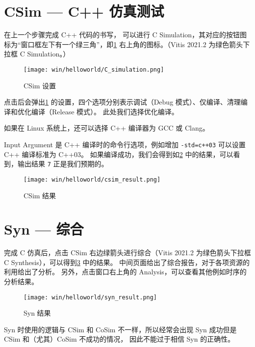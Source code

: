 \documentclass[Chinese,TC,use boldface,simple Names]{beaulivre}
\begin{document}
  \section{CSim --- C++ 仿真测试}

    在上一个步骤完成 C++ 代码的书写，
    可以进行 C Simulation，其对应的按钮图标为“窗口框左下有一个绿三角”，即\cref{fig:C_simulation} 右上角的图标。（Vitis 2021.2 为绿色箭头下拉框 C Simulation。）
    \begin{figure}[htbp]
      \centering
      \texttt{[image: win/helloworld/C\_simulation.png]}
      \caption{CSim 设置}
      \label{fig:C_simulation}
    \end{figure}

    点击后会弹出\cref{fig:C_simulation} 的设置，四个选项分别表示调试（Debug 模式）、仅编译、清理编译和优化编译（Release 模式）。
    此处我们选择优化编译。
    \begin{tip}
      如果在 Linux 系统上，还可以选择 C++ 编译器为 GCC 或 Clang。
    \end{tip}
    Input Argument 是 C++ 编译时的命令行选项，例如增加 \texttt{-std=c++03} 可以设置 C++ 编译标准为 C++03。
    如果编译成功，我们会得到如\cref{fig:csim_result} 中的结果，可以看到，输出结果 \texttt{7} 正是我们预期的。
    \begin{figure}[htbp]
      \centering
      \texttt{[image: win/helloworld/csim\_result.png]}
      \caption{CSim 结果}
      \label{fig:csim_result}
    \end{figure}

  \section{Syn --- 综合}

    完成 C 仿真后，点击 CSim 右边绿箭头进行综合（Vitis 2021.2 为绿色箭头下拉框 C Synthesis），可以得到\cref{fig:syn_result} 中的结果。
    中间页面给出了综合报告，对于各项资源的利用给出了分析。
    另外，点击窗口右上角的 Analysis，可以查看其他例如时序的分析结果。
    \begin{figure}[htbp]
      \centering
      \texttt{[image: win/helloworld/syn\_result.png]}
      \caption{Syn 结果}
      \label{fig:syn_result}
    \end{figure}
    \begin{warning}
      Syn 时使用的逻辑与 CSim 和 CoSim 不一样，所以经常会出现 Syn 成功但是 CSim 和（尤其）CoSim 不成功的情况，
      因此不能过于相信 Syn 的正确性。
    \end{warning}
\end{document}
